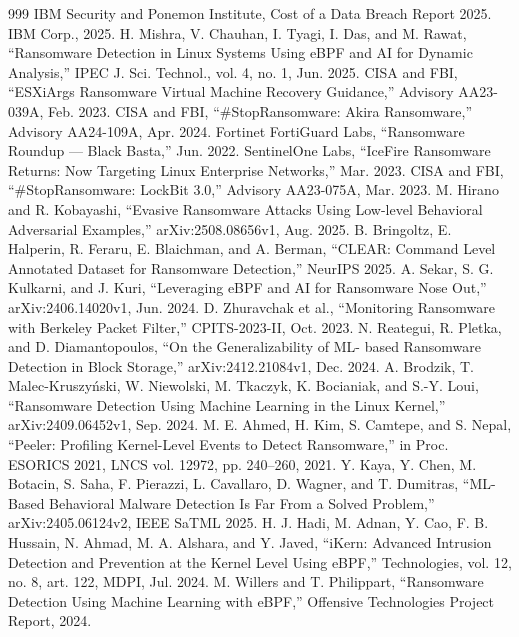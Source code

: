 \begin{thebibliography}{999}
 IBM Security and Ponemon Institute, Cost of a Data Breach Report 2025. IBM Corp., 2025.
 H. Mishra, V. Chauhan, I. Tyagi, I. Das, and M. Rawat, ``Ransomware Detection in Linux Systems Using eBPF and AI for Dynamic Analysis,'' IPEC J. Sci. Technol., vol. 4, no. 1, Jun. 2025.
 CISA and FBI, ``ESXiArgs Ransomware Virtual Machine Recovery Guidance,'' Advisory AA23-039A, Feb. 2023.
 CISA and FBI, ``\#StopRansomware: Akira Ransomware,'' Advisory AA24-109A, Apr. 2024.
 Fortinet FortiGuard Labs, ``Ransomware Roundup --- Black Basta,'' Jun. 2022.
 SentinelOne Labs, ``IceFire Ransomware Returns: Now Targeting Linux Enterprise Networks,'' Mar. 2023.
 CISA and FBI, ``\#StopRansomware: LockBit 3.0,'' Advisory AA23-075A, Mar. 2023.
 M. Hirano and R. Kobayashi, ``Evasive Ransomware Attacks Using Low-level Behavioral Adversarial Examples,'' arXiv:2508.08656v1, Aug. 2025.
 B. Bringoltz, E. Halperin, R. Feraru, E. Blaichman, and A. Berman, ``CLEAR: Command Level Annotated Dataset for Ransomware Detection,'' NeurIPS 2025.
 A. Sekar, S. G. Kulkarni, and J. Kuri, ``Leveraging eBPF and AI for Ransomware Nose Out,'' arXiv:2406.14020v1, Jun. 2024.
 D. Zhuravchak et al., ``Monitoring Ransomware with Berkeley Packet Filter,'' CPITS-2023-II, Oct. 2023.
 N. Reategui, R. Pletka, and D. Diamantopoulos, ``On the Generalizability of ML- based Ransomware Detection in Block Storage,'' arXiv:2412.21084v1, Dec. 2024.
 A. Brodzik, T. Malec-Kruszy\'{n}ski, W. Niewolski, M. Tkaczyk, K. Bocianiak, and S.-Y. Loui, ``Ransomware Detection Using Machine Learning in the Linux Kernel,'' arXiv:2409.06452v1, Sep. 2024.
 M. E. Ahmed, H. Kim, S. Camtepe, and S. Nepal, ``Peeler: Profiling Kernel-Level Events to Detect Ransomware,'' in Proc. ESORICS 2021, LNCS vol. 12972, pp. 240--260, 2021.
 Y. Kaya, Y. Chen, M. Botacin, S. Saha, F. Pierazzi, L. Cavallaro, D. Wagner, and T. Dumitras, ``ML-Based Behavioral Malware Detection Is Far From a Solved Problem,'' arXiv:2405.06124v2, IEEE SaTML 2025.
 H. J. Hadi, M. Adnan, Y. Cao, F. B. Hussain, N. Ahmad, M. A. Alshara, and Y. Javed, ``iKern: Advanced Intrusion Detection and Prevention at the Kernel Level Using eBPF,'' Technologies, vol. 12, no. 8, art. 122, MDPI, Jul. 2024.
 M. Willers and T. Philippart, ``Ransomware Detection Using Machine Learning with eBPF,'' Offensive Technologies Project Report, 2024.

\end{thebibliography}
